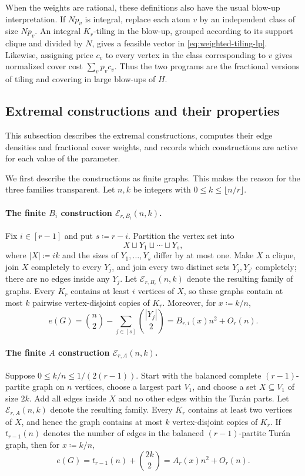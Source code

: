 \documentclass[10pt]{article}
\numberwithin{equation}{section}
\newcommand{\cE}{\mathcal E}
\begin{document}
When the weights are rational, these definitions also have the usual blow-up interpretation.  If $N p_v$ is integral, replace each atom $v$ by an independent class of size $Np_v$.  An integral $K_r$-tiling in the blow-up, grouped according to its support clique and divided by $N$, gives a feasible vector in \cref{eq:weighted-tiling-lp}.  Likewise, assigning price $c_v$ to every vertex in the class corresponding to $v$ gives normalized cover cost $\sum_vp_vc_v$.  Thus the two programs are the fractional versions of tiling and covering in large blow-ups of $H$.

\subsection{Extremal constructions and their properties}\label{sec:constructions}

This subsection describes the extremal constructions, computes their edge densities and fractional cover weights, and records which constructions are active for each value of the parameter.

We first describe the constructions as finite graphs.  This makes the reason for the three families transparent. 
Let $n,k$ be integers with $0\le k\le\lfloor n/r\rfloor$.

\paragraph{The finite $B_i$ construction $\cE_{r,B_i}(n,k)$.}
Fix $i\in[r-1]$ and put $s\coloneqq r-i$.  Partition the vertex set into
\[
 X\sqcup Y_1\sqcup\cdots\sqcup Y_s,
\]
where $|X|\coloneqq ik$ and the sizes of $Y_1,\ldots,Y_s$ differ by at most one.  Make $X$ a clique, join $X$ completely to every $Y_j$, and join every two distinct sets $Y_j,Y_{j'}$ completely; there are no edges inside any $Y_j$.  Let $\cE_{r,B_i}(n,k)$ denote the resulting family of graphs.  Every $K_r$ contains at least $i$ vertices of $X$, so these graphs contain at most $k$ pairwise vertex-disjoint copies of $K_r$.  Moreover, for $x\coloneqq k/n$,
\begin{equation}\label{eq:finite-B-count}
 e(G)=\binom n2-\sum_{j\in[s]}\binom{|Y_j|}{2}
 =B_{r,i}(x)n^2+O_r(n).
\end{equation}

\paragraph{The finite $A$ construction $\cE_{r,A}(n,k)$.}
Suppose $0\le k/n\le1/(2(r-1))$.  Start with the balanced complete $(r-1)$-partite graph on $n$ vertices, choose a largest part $V_1$, and choose a set $X\subseteq V_1$ of size $2k$.  Add all edges inside $X$ and no other edges within the Tur\'an parts.  Let $\cE_{r,A}(n,k)$ denote the resulting family.  Every $K_r$ contains at least two vertices of $X$, and hence the graph contains at most $k$ vertex-disjoint copies of $K_r$.  If $t_{r-1}(n)$ denotes the number of edges in the balanced $(r-1)$-partite Tur\'an graph, then for $x\coloneqq k/n$,
\begin{equation}\label{eq:finite-A-count}
 e(G)=t_{r-1}(n)+\binom{2k}{2}
 =A_r(x)n^2+O_r(n).
\end{equation}
\end{document}
